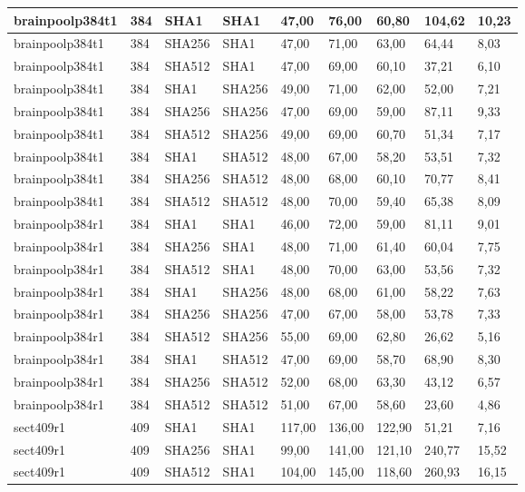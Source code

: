 \begin{longtable}{| l | l | l | l | l |l |l |l |l |}
brainpoolp384t1 & 384 & SHA1 & SHA1 & 47,00 & 76,00 & 60,80 & 104,62 & 10,23 \\ \hline 
brainpoolp384t1 & 384 & SHA256 & SHA1 & 47,00 & 71,00 & 63,00 & 64,44 & 8,03 \\ \hline 
brainpoolp384t1 & 384 & SHA512 & SHA1 & 47,00 & 69,00 & 60,10 & 37,21 & 6,10 \\ \hline 
brainpoolp384t1 & 384 & SHA1 & SHA256 & 49,00 & 71,00 & 62,00 & 52,00 & 7,21 \\ \hline 
brainpoolp384t1 & 384 & SHA256 & SHA256 & 47,00 & 69,00 & 59,00 & 87,11 & 9,33 \\ \hline 
brainpoolp384t1 & 384 & SHA512 & SHA256 & 49,00 & 69,00 & 60,70 & 51,34 & 7,17 \\ \hline 
brainpoolp384t1 & 384 & SHA1 & SHA512 & 48,00 & 67,00 & 58,20 & 53,51 & 7,32 \\ \hline 
brainpoolp384t1 & 384 & SHA256 & SHA512 & 48,00 & 68,00 & 60,10 & 70,77 & 8,41 \\ \hline 
brainpoolp384t1 & 384 & SHA512 & SHA512 & 48,00 & 70,00 & 59,40 & 65,38 & 8,09 \\ \hline 
brainpoolp384r1 & 384 & SHA1 & SHA1 & 46,00 & 72,00 & 59,00 & 81,11 & 9,01 \\ \hline 
brainpoolp384r1 & 384 & SHA256 & SHA1 & 48,00 & 71,00 & 61,40 & 60,04 & 7,75 \\ \hline 
brainpoolp384r1 & 384 & SHA512 & SHA1 & 48,00 & 70,00 & 63,00 & 53,56 & 7,32 \\ \hline 
brainpoolp384r1 & 384 & SHA1 & SHA256 & 48,00 & 68,00 & 61,00 & 58,22 & 7,63 \\ \hline 
brainpoolp384r1 & 384 & SHA256 & SHA256 & 47,00 & 67,00 & 58,00 & 53,78 & 7,33 \\ \hline 
brainpoolp384r1 & 384 & SHA512 & SHA256 & 55,00 & 69,00 & 62,80 & 26,62 & 5,16 \\ \hline 
brainpoolp384r1 & 384 & SHA1 & SHA512 & 47,00 & 69,00 & 58,70 & 68,90 & 8,30 \\ \hline 
brainpoolp384r1 & 384 & SHA256 & SHA512 & 52,00 & 68,00 & 63,30 & 43,12 & 6,57 \\ \hline 
brainpoolp384r1 & 384 & SHA512 & SHA512 & 51,00 & 67,00 & 58,60 & 23,60 & 4,86 \\ \hline 
sect409r1 & 409 & SHA1 & SHA1 & 117,00 & 136,00 & 122,90 & 51,21 & 7,16 \\ \hline 
sect409r1 & 409 & SHA256 & SHA1 & 99,00 & 141,00 & 121,10 & 240,77 & 15,52 \\ \hline 
sect409r1 & 409 & SHA512 & SHA1 & 104,00 & 145,00 & 118,60 & 260,93 & 16,15 \\ \hline 

\end{longtable}
